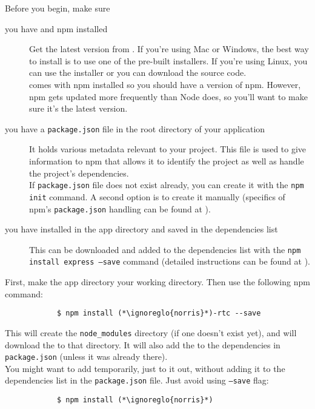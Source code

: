 		Before you begin, make sure
		\begin{description}
			\item[you have  and npm installed] Get the latest version from . If you're using Mac or Windows, the best way to install  is to use one of the pre-built installers. If you're using Linux, you can use the installer or you can download the source code.\\
			 comes with npm installed so you should have a version of npm. However, npm gets updated more frequently than Node does, so you'll want to make sure it's the latest version.
			\item[you have a \texttt{package.json} file in the root directory of your application] It holds various metadata relevant to your project. This file is used to give information to npm that allows it to identify the project as well as handle the project's dependencies.\\
			If \texttt{package.json} file does not exist already, you can create it with the \texttt{npm init} command. A second option is to create it manually (specifics of npm's \texttt{package.json} handling can be found at ).
			\item[you have  installed in the app directory and saved in the dependencies list] This  can be downloaded and added to the dependencies list with the \texttt{npm install express --save} command (detailed instructions can be found at ).
		\end{description}
		First, make the app directory your working directory. Then use the following npm command:
		\begin{lstlisting}
			$ npm install (*\ignoreglo{norris}*)-rtc --save
		\end{lstlisting}
		This will create the \texttt{node\_modules} directory (if one doesn't exist yet), and will download the  to that directory. It will also add the  to the dependencies in \texttt{package.json} (unless it was already there).\\
		You might want to add  temporarily, just to it out, without adding it to the dependencies list in the \texttt{package.json} file. Just avoid using \texttt{--save} flag:
		\begin{lstlisting}
			$ npm install (*\ignoreglo{norris}*)
		\end{lstlisting}